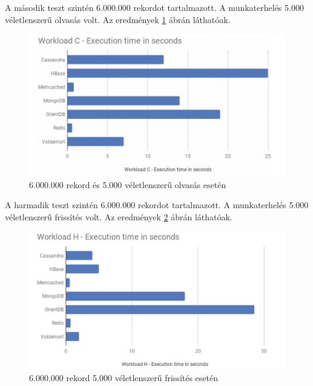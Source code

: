 A második teszt szintén 6.000.000 rekordot tartalmazott. A munkaterhelés 5.000 véletlenszerű olvasás volt. Az eredmények \ref{fig:performance_b} ábrán láthatóak.
	
	\begin{figure}
		\centering
		\includegraphics[scale=0.9]{figures/images/performance_b.png}
		\caption{6.000.000 rekord és 5.000 véletlenszerű olvasás esetén \cite{martins2019study}}
		\label{fig:performance_b}
	\end{figure}
	
A harmadik teszt szintén 6.000.000 rekordot tartalmazott. A munkaterhelés 5.000 véletlenszerű frissítés volt. Az eredmények \ref{fig:performance_c} ábrán láthatóak.
	
	\begin{figure}
		\centering
		\includegraphics[scale=0.9]{figures/images/performance_c.png}
		\caption{6.000.000 rekord 5.000 véletlenszerű frissítés esetén \cite{martins2019study}}
		\label{fig:performance_c}
	\end{figure}